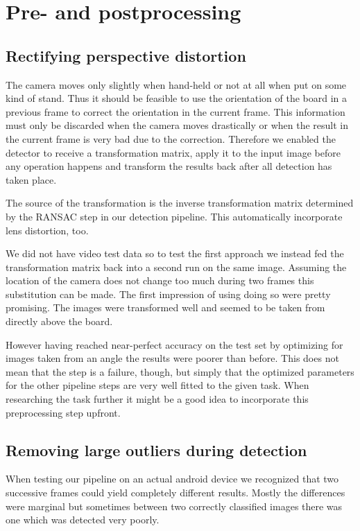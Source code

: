 	\section{Pre- and postprocessing}
	\label{evaluation-prepostprocessing}

	\subsection{Rectifying perspective distortion}
	\label{evaluation-prepostprocessing-perspectiveRectifying}
	The camera moves only slightly when hand-held or not at all when put on some kind of stand. Thus it should be feasible to use the orientation of the board in a previous frame to correct the orientation in the current frame. This information must only be discarded when the camera moves drastically or when the result in the current frame is very bad due to the correction. Therefore we enabled the detector to receive a transformation matrix, apply it to the input image before any operation happens and transform the results back after all detection has taken place.

	The source of the transformation is the inverse transformation matrix determined by the RANSAC step in our detection pipeline. This automatically incorporate lens distortion, too.

	We did not have video test data so to test the first approach we instead fed the transformation matrix back into a second run on the same image. Assuming the location of the camera does not change too much during two frames this substitution can be made. The first impression of using doing so were pretty promising. The images were transformed well and seemed to be taken from directly above the board.

	However having reached near-perfect accuracy on the test set by optimizing for images taken from an angle the results were poorer than before. This does not mean that the step is a failure, though, but simply that the optimized parameters for the other pipeline steps are very well fitted to the given task. When researching the task further it might be a good idea to incorporate this preprocessing step upfront.

	\subsection{Removing large outliers during detection}
	\label{evaluation-prepostprocessing-filteringOutliers}
	When testing our pipeline on an actual android device we recognized that two successive frames could yield completely different results. Mostly the differences were marginal but sometimes between two correctly classified images there was one which was detected very poorly.

